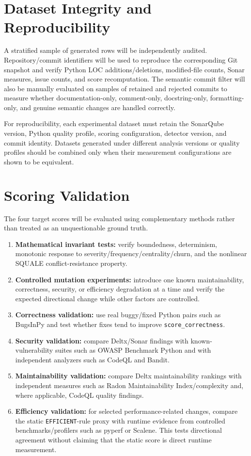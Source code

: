 \documentclass[12pt,a4paper,oneside]{report}
\newcommand{\code}[1]{\nolinkurl{#1}}
\begin{document}
\section{Dataset Integrity and Reproducibility}
A stratified sample of generated rows will be independently audited. Repository/commit identifiers will be used to reproduce the corresponding Git snapshot and verify Python LOC additions/deletions, modified-file counts, Sonar measures, issue counts, and score recomputation. The semantic commit filter will also be manually evaluated on samples of retained and rejected commits to measure whether documentation-only, comment-only, docstring-only, formatting-only, and genuine semantic changes are handled correctly.

For reproducibility, each experimental dataset must retain the SonarQube version, Python quality profile, scoring configuration, detector version, and commit identity. Datasets generated under different analysis versions or quality profiles should be combined only when their measurement configurations are shown to be equivalent.

\section{Scoring Validation}
The four target scores will be evaluated using complementary methods rather than treated as an unquestionable ground truth.

\begin{enumerate}[leftmargin=*]
    \item \textbf{Mathematical invariant tests:} verify boundedness, determinism, monotonic response to severity/frequency/centrality/churn, and the nonlinear SQUALE conflict-resistance property.
    \item \textbf{Controlled mutation experiments:} introduce one known maintainability, correctness, security, or efficiency degradation at a time and verify the expected directional change while other factors are controlled.
    \item \textbf{Correctness validation:} use real buggy/fixed Python pairs such as BugsInPy and test whether fixes tend to improve \code{score\_correctness}.
    \item \textbf{Security validation:} compare Deltx/Sonar findings with known-vulnerability suites such as OWASP Benchmark Python and with independent analyzers such as CodeQL and Bandit.
    \item \textbf{Maintainability validation:} compare Deltx maintainability rankings with independent measures such as Radon Maintainability Index/complexity and, where applicable, CodeQL quality findings.
    \item \textbf{Efficiency validation:} for selected performance-related changes, compare the static \code{EFFICIENT}-rule proxy with runtime evidence from controlled benchmarks/profilers such as pyperf or Scalene. This tests directional agreement without claiming that the static score is direct runtime measurement.
\end{enumerate}
\end{document}
